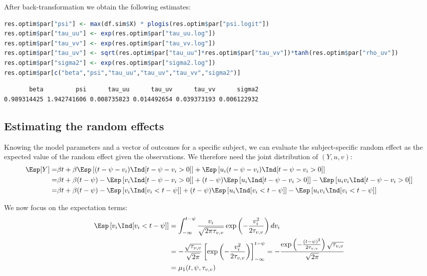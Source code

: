 \documentclass[12pt]{article}
\begin{document}
After back-transformation we obtain the following estimates:
\begin{lstlisting}[language=r,numbers=none]
res.optim$par["psi"] <- max(df.sim$X) * plogis(res.optim$par["psi.logit"])
res.optim$par["tau_uu"] <- exp(res.optim$par["tau_uu.log"])
res.optim$par["tau_vv"] <- exp(res.optim$par["tau_vv.log"])
res.optim$par["tau_uv"] <- sqrt(res.optim$par["tau_uu"]*res.optim$par["tau_vv"])*tanh(res.optim$par["rho_uv"])
res.optim$par["sigma2"] <- exp(res.optim$par["sigma2.log"])
res.optim$par[c("beta","psi","tau_uu","tau_uv","tau_vv","sigma2")]
\end{lstlisting}

\label{}
\begin{verbatim}
       beta         psi      tau_uu      tau_uv      tau_vv      sigma2 
0.989314425 1.942741606 0.008735823 0.014492654 0.039373193 0.006122932
\end{verbatim}
\subsection{Estimating the random effects}
\label{sec:org14f9c47}

Knowing the model parameters and a vector of outcomes for a specific
subject, we can evaluate the subject-specific random effect as the
expected value of the random effect given the observations. We
therefore need the joint distribution of \((Y,u,v)\):
\begin{align*}
\Esp[Y] =& \beta t + \beta \Esp\left[(t-\psi-v_i)\Ind[t-\psi-v_i>0]\right]  + \Esp\left[u_i(t-\psi-v_i)\Ind[t-\psi-v_i>0]\right] \\
 =& \beta t + \beta (t-\psi) - \Esp\left[v_i\Ind[t-\psi-v_i>0]\right] + (t-\psi)\Esp\left[u_i\Ind[t-\psi-v_i>0]\right] - \Esp\left[u_i v_i\Ind[t-\psi-v_i>0]\right] \\
 =& \beta t + \beta (t-\psi) - \Esp\left[v_i\Ind[v_i < t-\psi]\right] + (t-\psi)\Esp\left[u_i\Ind[v_i<t-\psi]\right] - \Esp\left[u_i v_i\Ind[v_i<t-\psi]\right] 
\end{align*}

\noindent We now focus on the expectation terms:
\begin{align*}
\Esp\left[v_i\Ind[v_i < t-\psi]\right]
&= \int_{-\infty}^{t-\psi} \frac{v_i}{\sqrt{2\pi \tau_{v,v}}} \exp\left(-\frac{v_i^2}{2\tau_{v,v}}\right)dv_i \\
&= -\frac{\sqrt{\tau_{v,v}}}{\sqrt{2\pi}}\left[\exp\left(-\frac{v_i^2}{2\tau_{v,v}}\right) \right]_{-\infty}^{t-\psi}
= -\frac{\exp\left(-\frac{(t-\psi)^2}{2\tau_{v,v}}\right) \sqrt{\tau_{v,v}}}{\sqrt{2\pi}} \\
&= \mu_1(t,\psi,\tau_{v,v})
\end{align*}
\end{document}
